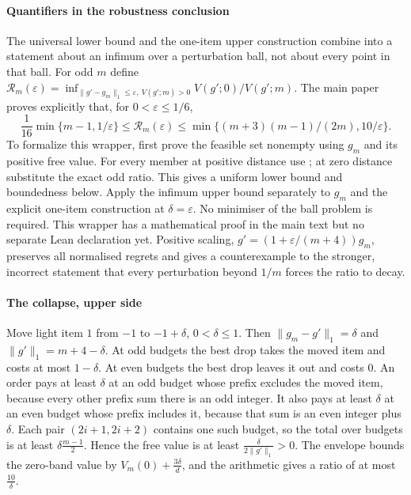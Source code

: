 
\paragraph{Quantifiers in the robustness conclusion}
The universal lower bound and the one-item upper construction combine into a statement about
an infimum over a perturbation ball, not about every point in that ball. For odd $m$ define
$\mathcal R_m(\varepsilon)=\inf_{\|g'-g_m\|_1\le\varepsilon,\ V(g';m)>0}
V(g';0)/V(g';m)$. The main paper proves explicitly that, for $0<\varepsilon\le1/6$,
\[
\frac1{16}\min\{m-1,1/\varepsilon\}\le\mathcal R_m(\varepsilon)
\le\min\{(m+3)(m-1)/(2m),10/\varepsilon\}.
\]
To formalize this wrapper, first prove the feasible set nonempty using $g_m$ and its positive
free value. For every member at positive distance use ; at zero distance
substitute the exact odd ratio. This gives a uniform lower bound and boundedness below.
Apply the infimum upper bound separately to $g_m$ and the explicit one-item construction at
$\delta=\varepsilon$. No minimiser of the ball problem is required.
This wrapper has a mathematical proof in the main text but no separate Lean declaration yet.
Positive scaling, $g'=(1+\varepsilon/(m+4))g_m$, preserves all normalised regrets and gives a
counterexample to the stronger, incorrect statement that every perturbation beyond $1/m$
forces the ratio to decay.

\paragraph{The collapse, upper side} Move light item $1$ from $-1$ to $-1+\delta$,
$0<\delta\le1$. Then $\|g_{m}-g'\|_{1}=\delta$ and $\|g'\|_{1}=m+4-\delta$. At odd budgets
the best drop takes the moved item and costs at most $1-\delta$. At even budgets the best
drop leaves it out and costs $0$. An order pays at least $\delta$ at an odd budget whose
prefix excludes the moved item, because every other prefix sum there is an odd integer. It
also pays at least $\delta$ at an even budget whose prefix includes it, because that sum is an
even integer plus $\delta$. Each pair $(2i+1,2i+2)$ contains one such budget, so the total
over budgets is at least $\delta\frac{m-1}{2}$. Hence the free value is at least
$\frac{\delta}{2\|g'\|_{1}}>0$. The envelope bounds the zero-band value by
$V_{m}(0)+\frac{3\delta}{d}$, and the arithmetic gives a ratio of at most
$\frac{10}{\delta}$.

